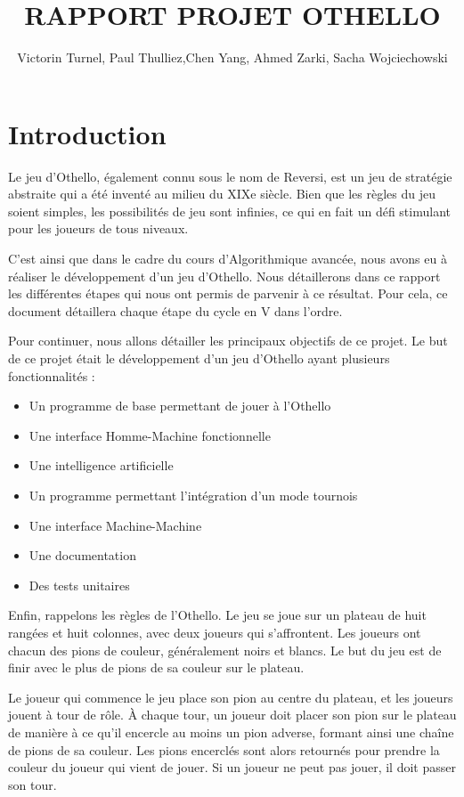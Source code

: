 \documentclass{article}
\title{RAPPORT PROJET OTHELLO}
\author{Victorin Turnel, Paul Thulliez,Chen Yang, Ahmed Zarki, Sacha Wojciechowski}
\begin{document}
\maketitle
\tableofcontents

\section{Introduction}
Le jeu d'Othello, également connu sous le nom de Reversi, est un jeu de stratégie abstraite qui a été inventé au milieu du XIXe siècle. Bien que les règles du jeu soient simples, les possibilités de jeu sont infinies, ce qui en fait un défi stimulant pour les joueurs de tous niveaux.


C'est ainsi que dans le cadre du cours d'Algorithmique avancée, nous avons eu à réaliser le développement d'un jeu d'Othello. Nous détaillerons dans ce rapport les différentes étapes qui nous ont permis de parvenir à ce résultat. Pour cela, ce document détaillera chaque étape du cycle en V dans l'ordre. 


Pour continuer, nous allons détailler les principaux objectifs de ce projet. Le but de ce projet était le développement d'un jeu d'Othello ayant plusieurs fonctionnalités :
\begin{itemize}
    \item Un programme de base permettant de jouer à l'Othello
    \item Une interface Homme-Machine fonctionnelle
    \item Une intelligence artificielle
    \item Un programme permettant l'intégration d'un mode tournois
    \item Une interface Machine-Machine
    \item Une documentation
    \item Des tests unitaires
\end{itemize}

Enfin, rappelons les règles de l'Othello. Le jeu se joue sur un plateau de huit rangées et huit colonnes, avec deux joueurs qui s'affrontent. Les joueurs ont chacun des pions de couleur, généralement noirs et blancs. Le but du jeu est de finir avec le plus de pions de sa couleur sur le plateau.

Le joueur qui commence le jeu place son pion au centre du plateau, et les joueurs jouent à tour de rôle. À chaque tour, un joueur doit placer son pion sur le plateau de manière à ce qu'il encercle au moins un pion adverse, formant ainsi une chaîne de pions de sa couleur. Les pions encerclés sont alors retournés pour prendre la couleur du joueur qui vient de jouer. Si un joueur ne peut pas jouer, il doit passer son tour.
\end{document}
